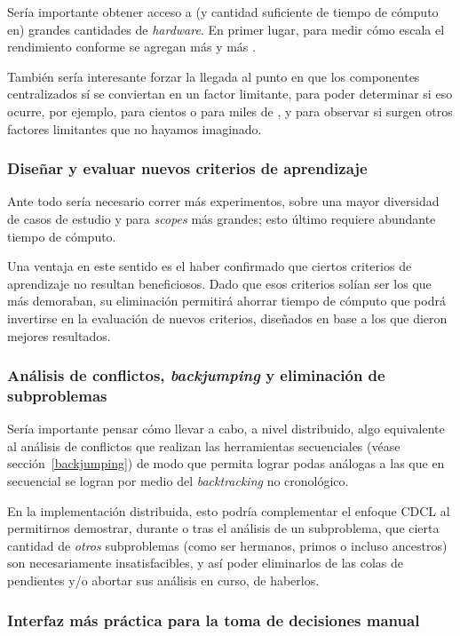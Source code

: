 Sería importante obtener acceso a (y cantidad suficiente de tiempo de cómputo en) grandes cantidades de \emph{hardware}. En primer lugar, para medir cómo escala el rendimiento conforme se agregan más y más \ws.

También sería interesante forzar la llegada al punto en que los componentes centralizados sí se conviertan en un factor limitante, para poder determinar si eso ocurre, por ejemplo, para cientos o para miles de \ws, y para observar si surgen otros factores limitantes que no hayamos imaginado.


\subsubsection{Diseñar y evaluar nuevos criterios de aprendizaje}

Ante todo sería necesario correr más experimentos, sobre una mayor diversidad de casos de estudio y para \emph{scopes} más grandes; esto último requiere abundante tiempo de cómputo.

Una ventaja en este sentido es el haber confirmado que ciertos criterios de aprendizaje no resultan beneficiosos. Dado que esos criterios solían ser los que más demoraban, su eliminación permitirá ahorrar tiempo de cómputo que podrá invertirse en la evaluación de nuevos criterios, diseñados en base a los que dieron mejores resultados.


\subsubsection{Análisis de conflictos, \emph{backjumping} y eliminación de subproblemas}

Sería importante pensar cómo llevar a cabo, a nivel distribuido, algo equivalente al análisis de conflictos que realizan las herramientas secuenciales (véase sección~\ref{backjumping}) de modo que permita lograr podas análogas a las que en secuencial se logran por medio del \emph{backtracking} no cronológico.

En la implementación distribuida, esto podría complementar el enfoque CDCL al permitirnos demostrar, durante o tras el análisis de un subproblema, que cierta cantidad de \emph{otros} subproblemas (como ser hermanos, primos o incluso ancestros) son necesariamente insatisfacibles, y así poder eliminarlos de las colas de pendientes y/o abortar sus análisis en curso, de haberlos.


\subsubsection{Interfaz más práctica para la toma de decisiones manual}


